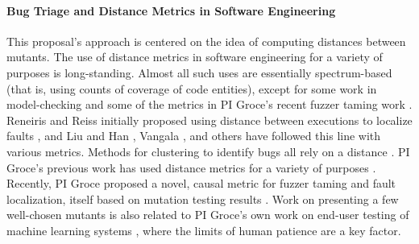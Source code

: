 \paragraph{Bug Triage and Distance Metrics in Software Engineering}
%
This proposal's approach is centered on
the idea of computing distances between mutants.  The use of distance metrics in
software engineering for a variety of  
purposes is long-standing.  Almost all such uses are
essentially spectrum-based \cite{RepsSpectra} (that is, using counts
of coverage of code entities), except for some work in model-checking
\cite{GroceDist,ChakiLev} and some of the metrics in PI Groce's recent fuzzer
taming work \cite{PLDI13}.  Reneiris and Reiss initially proposed
using distance between executions to localize faults
\cite{NearNeighbor}, and Liu and Han \cite{Liu06}, Vangala \cite{VangalaDist}, and others have
followed this line with various metrics.
Methods for clustering to identify bugs all rely on a distance \cite{Podgurski04}.  PI Groce's previous work
has used distance metrics for a variety of purposes 
\cite{PLDI13,icst2014,issta14}.  Recently, PI Groce proposed a novel,
causal metric for fuzzer taming and fault localization, itself based on
mutation testing results \cite{distMut}.  Work on
presenting a few well-chosen mutants
is also related to PI Groce's own work on end-user testing of machine learning
systems \cite{EndUserMistake,OnlyOracle}, where the limits of human
patience are a key factor.  
